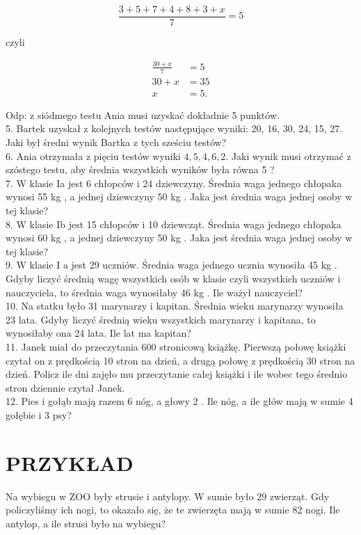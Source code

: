 \documentclass[10pt]{article}
\begin{document}
\[
\frac{3+5+7+4+8+3+x}{7}=5
\]

czyli

\[
\begin{aligned}
\frac{30+x}{7} & =5 \\
30+x & =35 \\
x & =5 .
\end{aligned}
\]

Odp: z siódmego testu Ania musi uzyskać dokładnie 5 punktów.\\
5. Bartek uzyskał z kolejnych testów następujące wyniki: 20, 16, 30, 24, 15, 27. Jaki był średni wynik Bartka z tych sześciu testów?\\
6. Ania otrzymała z pięciu testów wyniki \(4,5,4,6,2\). Jaki wynik musi otrzymać z szóstego testu, aby średnia wszystkich wyników była równa 5 ?\\
7. W klasie Ia jest 6 chłopców i 24 dziewczyny. Średnia waga jednego chłopaka wynosi 55 kg , a jednej dziewczyny 50 kg . Jaka jest średnia waga jednej osoby w tej klasie?\\
8. W klasie Ib jest 15 chłopców i 10 dziewcząt. Średnia waga jednego chłopaka wynosi 60 kg , a jednej dziewczyny 50 kg . Jaka jest średnia waga jednej osoby w tej klasie?\\
9. W klasie I a jest 29 uczniów. Średnia waga jednego ucznia wynosiła 45 kg . Gdyby liczyć średnią wagę wszystkich osób w klasie czyli wszystkich uczniów i nauczyciela, to średnia waga wynosiłaby 46 kg . Ile ważył nauczyciel?\\
10. Na statku było 31 marynarzy i kapitan. Średnia wieku marynarzy wynosiła 23 lata. Gdyby liczyć średnią wieku wszystkich marynarzy i kapitana, to wynosiłaby ona 24 lata. Ile lat ma kapitan?\\
11. Janek miał do przeczytania 600 stronicową książkę. Pierwszą połowę książki czytał on z prędkością 10 stron na dzień, a drugą połowę z prędkością 30 stron na dzień. Policz ile dni zajęło mu przeczytanie całej książki i ile wobec tego średnio stron dziennie czytał Janek.\\
12. Pies i gołąb mają razem 6 nóg, a głowy 2 . Ile nóg, a ile głów mają w sumie 4 gołębie i 3 psy?

\section*{PRZYKŁAD}
Na wybiegu w ZOO były strusie i antylopy. W sumie było 29 zwierząt. Gdy policzyliśmy ich nogi, to okazało się, że te zwierzęta mają w sumie 82 nogi. Ile antylop, a ile strusi było na wybiegu?
\end{document}
